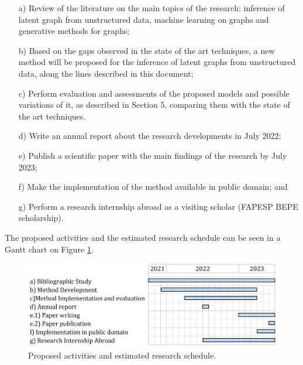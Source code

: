 \documentclass[12pt,a4paper]{article}
\begin{document}
	\begin{itemize}
	\item[a)]  Review of the literature on the main topics of the research: inference of latent graph from unstructured data, machine learning on graphs and generative methods for graphs;
	\item[b)] Based on the gaps observed in the state of the art techniques, a new method will be proposed for the inference of latent graphs from unstructured data, along the lines described in this document;
	\item[c)] Perform evaluation and assessments of the proposed models and possible variations of it, as described in Section 5, comparing them with the state of the art techniques.
	\item[d)] Write an annual report about the research developments in July 2022;
	\item[e)] Publish a scientific paper with the main findings of the research by July 2023;
	\item[f)] Make the implementation of the method available in public domain; and
	\item[g)] Perform a research internship abroad as a visiting scholar (FAPESP BEPE scholarship).
	\end{itemize}

	The proposed activities and the estimated research schedule can be seen in a Gantt chart on Figure \ref{plan}.

	\begin{figure}[hbtp]
		\centering \includegraphics[scale=0.40]{plan_v2.png}
		\caption{Proposed activities and estimated research schedule. \label{plan}}
	\end{figure}

	\printbibliography
\end{document}

